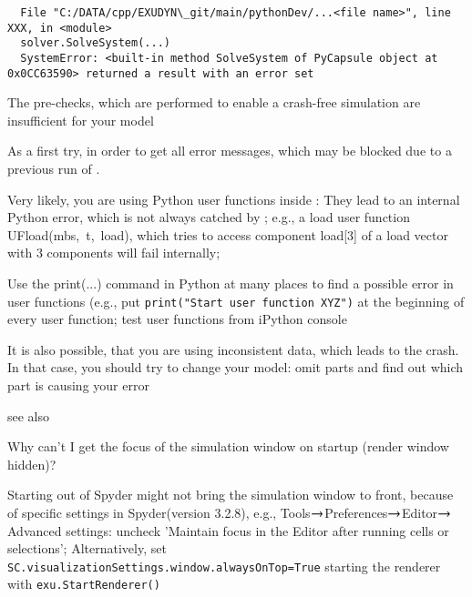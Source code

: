 \begin{lstlisting}
  File "C:/DATA/cpp/EXUDYN\_git/main/pythonDev/...<file name>", line XXX, in <module>
  solver.SolveSystem(...)
  SystemError: <built-in method SolveSystem of PyCapsule object at 0x0CC63590> returned a result with an error set
\end{lstlisting}
%
\item[$\ra$] The pre-checks, which are performed to enable a crash-free simulation are insufficient for your model
%
\item[$\ra$] As a first try,  in order to get all error messages, which may be blocked due to a previous run of \codeName.
%
\item[$\ra$] Very likely, you are using Python user functions inside \codeName: They lead to an internal Python error, which is not always catched by \codeName; e.g., a load user function UFload(mbs,~t,~load), which tries to access component load[3] of a load vector with 3 components will fail internally;
%
\item[$\ra$] Use the print(...) command in Python at many places to find a possible error in user functions (e.g., put \texttt{print("Start user function XYZ")} at the beginning of every user function; test user functions from iPython console
%
\item[$\ra$] It is also possible, that you are using inconsistent data, which leads to the crash. In that case, you should try to change your model: omit parts and find out which part is causing your error
%
\item[$\ra$] see also 
\ei

\item Why can't I get the focus of the simulation window on startup (render window hidden)?
\bi
\item[$\ra$] Starting \codeName out of Spyder might not bring the simulation window to front, because of specific settings in Spyder(version 3.2.8), e.g., Tools$\ra$Preferences$\ra$Editor$\ra$Advanced settings: uncheck 'Maintain focus in the Editor after running cells or selections'; Alternatively, set \texttt{SC.visualizationSettings.window.alwaysOnTop=True}  starting the renderer with \texttt{exu.StartRenderer()}
\ei
%
\en


